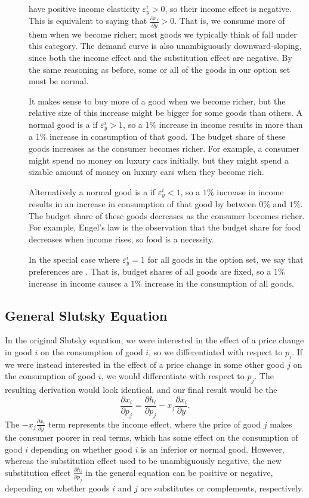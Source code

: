 \begin{description}
\item[] have positive income elasticity $\varepsilon_y^i > 0$, so their income effect is negative. This is equivalent to saying that $\frac{\partial x_i}{\partial y} > 0$. That is, we consume more of them when we become richer; most goods we typically think of fall under this category. The demand curve is also unambiguously downward-sloping, since both the income effect and the substitution effect are negative. By the same reasoning as before, some or all of the goods in our option set must be normal.

It makes sense to buy more of a good when we become richer, but the relative size of this increase might be bigger for some goods than others. A normal good is a  if $\varepsilon_y^i > 1$, so a $1\%$ increase in income results in more than a $1\%$ increase in consumption of that good. The budget share of these goods increases as the consumer becomes richer. For example, a consumer might spend no money on luxury cars initially, but they might spend a sizable amount of money on luxury cars when they become rich.

Alternatively a normal good is a  if $\varepsilon_y^i < 1$, so a $1\%$ increase in income results in an increase in consumption of that good by between $0\%$ and $1\%$. The budget share of these goods decreases as the consumer becomes richer. For example, Engel's law is the observation that the budget share for food decreases when income rises, so food is a necessity.

In the special case where $\varepsilon_y^i = 1$ for all goods in the option set, we say that preferences are . That is, budget shares of all goods are fixed, so a $1\%$ increase in income causes a $1\%$ increase in the consumption of all goods.

\end{description}

\subsection*{General Slutsky Equation}
In the original Slutsky equation, we were interested in the effect of a price change in good $i$ on the consumption of good $i$, so we differentiated with respect to $p_i$. If we were instead interested in the effect of a price change in some other good $j$ on the consumption of good $i$, we would differentiate with respect to $p_j$. The resulting derivation would look identical, and our final result would be the 
$$
\boxed{\frac{\partial x_{i}}{\partial p_{j}}=\frac{\partial h_{i}}{\partial p_{j}}-x_{j} \frac{\partial x_{i}}{\partial y}.}
$$
The $-x_{j} \frac{\partial x_{i}}{\partial y}$ term represents the income effect, where the price of good $j$ makes the consumer poorer in real terms, which has some effect on the consumption of good $i$ depending on whether good $i$ is an inferior or normal good. However, whereas the substitution effect used to be unambiguously negative, the new substitution effect $\frac{\partial h_{i}}{\partial p_{j}}$ in the general equation can be positive or negative, depending on whether goods $i$ and $j$ are substitutes or complements, respectively.


